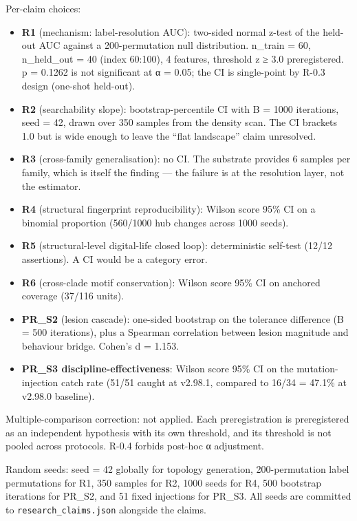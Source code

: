 \documentclass[
]{article}
\providecommand{\tightlist}{%
  \setlength{\itemsep}{0pt}\setlength{\parskip}{0pt}}
\begin{document}
Per-claim choices:

\begin{itemize}
\tightlist
\item
  \textbf{R1} (mechanism: label-resolution AUC): two-sided normal z-test
  of the held-out AUC against a 200-permutation null distribution.
  n\_train = 60, n\_held\_out = 40 (index 60:100), 4 features, threshold
  z ≥ 3.0 preregistered. p = 0.1262 is not significant at α = 0.05; the
  CI is single-point by R-0.3 design (one-shot held-out).
\item
  \textbf{R2} (searchability slope): bootstrap-percentile CI with B =
  1000 iterations, seed = 42, drawn over 350 samples from the density
  scan. The CI brackets 1.0 but is wide enough to leave the ``flat
  landscape'' claim unresolved.
\item
  \textbf{R3} (cross-family generalisation): no CI. The substrate
  provides 6 samples per family, which is itself the finding --- the
  failure is at the resolution layer, not the estimator.
\item
  \textbf{R4} (structural fingerprint reproducibility): Wilson score
  95\% CI on a binomial proportion (560/1000 hub changes across 1000
  seeds).
\item
  \textbf{R5} (structural-level digital-life closed loop): deterministic
  self-test (12/12 assertions). A CI would be a category error.
\item
  \textbf{R6} (cross-clade motif conservation): Wilson score 95\% CI on
  anchored coverage (37/116 units).
\item
  \textbf{PR\_S2} (lesion cascade): one-sided bootstrap on the tolerance
  difference (B = 500 iterations), plus a Spearman correlation between
  lesion magnitude and behaviour bridge. Cohen's d = 1.153.
\item
  \textbf{PR\_S3 discipline-effectiveness}: Wilson score 95\% CI on the
  mutation-injection catch rate (51/51 caught at v2.98.1, compared to
  16/34 = 47.1\% at v2.98.0 baseline).
\end{itemize}

Multiple-comparison correction: not applied. Each preregistration is
preregistered as an independent hypothesis with its own threshold, and
its threshold is not pooled across protocols. R-0.4 forbids post-hoc α
adjustment.

Random seeds: seed = 42 globally for topology generation,
200-permutation label permutations for R1, 350 samples for R2, 1000
seeds for R4, 500 bootstrap iterations for PR\_S2, and 51 fixed
injections for PR\_S3. All seeds are committed to
\texttt{research\_claims.json} alongside the claims.
\end{document}

